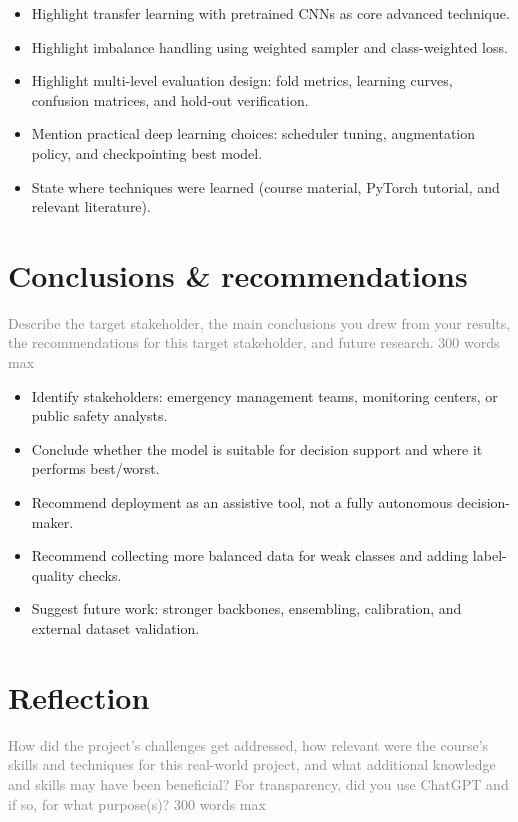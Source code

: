 \documentclass{article}
\begin{document}
\begin{itemize}
    \item Highlight transfer learning with pretrained CNNs as core advanced technique.
    \item Highlight imbalance handling using weighted sampler and class-weighted loss.
    \item Highlight multi-level evaluation design: fold metrics, learning curves, confusion matrices, and hold-out verification.
    \item Mention practical deep learning choices: scheduler tuning, augmentation policy, and checkpointing best model.
    \item State where techniques were learned (course material, PyTorch tutorial, and relevant literature).
\end{itemize}

\section{Conclusions \& recommendations}
\textcolor{gray}{Describe the target stakeholder, the main conclusions you drew from your results, the recommendations for this target stakeholder, and future research. 300 words max}

\begin{itemize}
    \item Identify stakeholders: emergency management teams, monitoring centers, or public safety analysts.
    \item Conclude whether the model is suitable for decision support and where it performs best/worst.
    \item Recommend deployment as an assistive tool, not a fully autonomous decision-maker.
    \item Recommend collecting more balanced data for weak classes and adding label-quality checks.
    \item Suggest future work: stronger backbones, ensembling, calibration, and external dataset validation.
\end{itemize}

\section{Reflection}
\textcolor{gray}{How did the project’s challenges get addressed, how relevant were the course’s skills and techniques for this real-world project, and what additional knowledge and skills may have been beneficial? For transparency, did you use ChatGPT and if so, for what purpose(s)? 300 words max}
\end{document}
